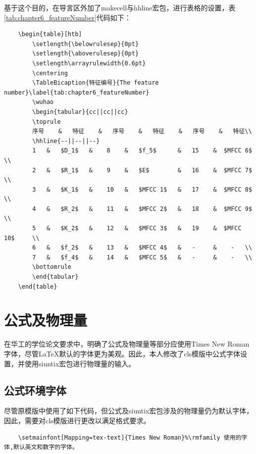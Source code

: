 基于这个目的，在导言区外加了makecell与hhline宏包，进行表格的设置，表\ref{tab:chapter6_featureNumber}代码如下：
\begin{lstlisting}
    \begin{table}[htb]
        \setlength{\belowrulesep}{0pt}
        \setlength{\aboverulesep}{0pt}
        \setlength\arrayrulewidth{0.6pt}
        \centering
        \TableBicaption{特征编号}{The feature number}\label{tab:chapter6_featureNumber}
        \wuhao
        \begin{tabular}{cc||cc||cc}
        \toprule
        序号    &   特征    &   序号    &   特征    &   序号    &   特征\\
        \hhline{--||--||--}
        1   &   $D_1$   &    8    &   $f_5$      &   15    &  $MFCC 6$     \\
        2   &   $R_1$   &    9    &   $E$        &   16    &  $MFCC 7$     \\
        3   &   $K_1$   &    10   &   $MFCC 1$   &   17    &  $MFCC 8$     \\
        4   &   $R_2$   &    11   &   $MFCC 2$   &   18    &  $MFCC 9$     \\
        5   &   $K_2$   &    12   &   $MFCC 3$   &   19    &  $MFCC 10$     \\
        6   &   $f_2$   &    13   &   $MFCC 4$   &   -     &    -   \\
        7   &   $f_4$   &    14   &   $MFCC 5$   &   -     &    -   \\
        \bottomrule
        \end{tabular}
    \end{table}
\end{lstlisting}

\section{公式及物理量}
在华工的学位论文要求中，明确了公式及物理量等部分应使用Times New Roman字体，尽管\LaTeX{}默认的字体更为美观。因此，本人修改了cls模版中公式字体设置，并使用siuntix宏包进行物理量的输入。
\subsection{公式环境字体}
尽管原模版中使用了如下代码，但公式及siuntix宏包涉及的物理量仍为默认字体，因此，需要对cls模版进行更改以满足格式要求。
\begin{lstlisting}
    \setmainfont[Mapping=tex-text]{Times New Roman}%\rmfamily 使用的字体,默认英文和数字的字体。
\end{lstlisting}

